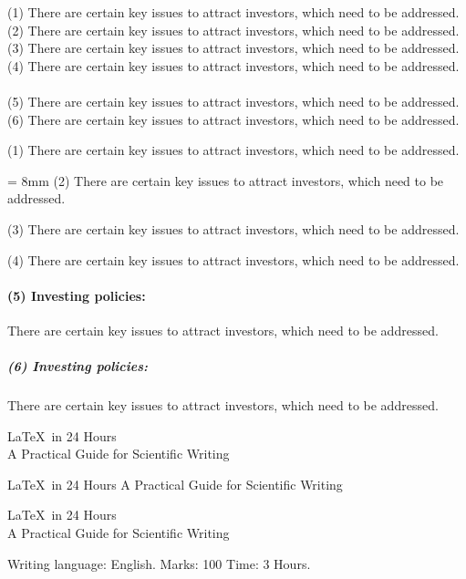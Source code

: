 \documentclass[11pt,a4paper]{article}
\begin{document}
    
    
    
    
    
    
    
    
(1) There are certain key issues to attract
investors, which need to be addressed.
\newline
(2) There are certain key issues to attract
investors, which need to be addressed.\linebreak
(3) There are certain key issues to attract
investors, which need to be addressed.\\
(4) There are certain key issues to attract
investors, which need to be addressed.\\\\
(5) There are certain key issues to attract
investors, which need to be addressed.
(6) There are certain key issues to attract
investors, which need to be addressed.


 \par
    (1) There are certain key issues to attract
    investors, which need to be addressed.
    \par \parindent = 8mm
    (2) There are certain key issues to attract
    investors, which need to be addressed.
    \par \noindent \parskip 2mm
    (3) There are certain key issues to attract
    investors, which need to be addressed.
    \par
    (4) There are certain key issues to attract
    investors, which need to be addressed.
    \paragraph{(5) Investing policies:}
    There are certain key issues to attract
    investors, which need to be addressed.
    \subparagraph{(6) Investing policies:}
    There are certain key issues to attract
    investors, which need to be addressed.
    
    \begin{center}
    \LaTeX\ in 24 Hours
    \vspace{8mm}\\
    A Practical Guide for Scientific Writing
    \end{center}

    \begin{center}
        \LaTeX\ in 24 Hours
        \vskip 8mm
        A Practical Guide for Scientific Writing
    \end{center}
    \begin{center}
        \LaTeX\ in 24 Hours
        \vspace{8mm}\\
        A Practical Guide for Scientific Writing
    \end{center}
    Writing language: \hspace{5mm} English.
    Marks: 100 \hfill Time: 3 Hours.
\end{document}

